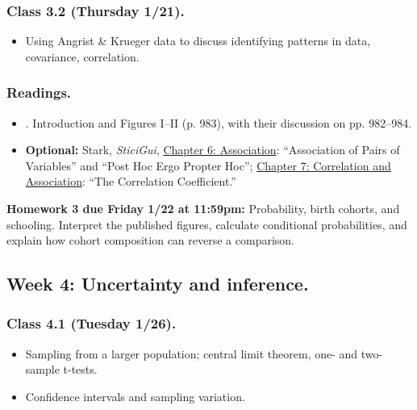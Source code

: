 \documentclass[letterpaper, 12pt, parskip=full,DIV=10]{scrartcl}
\begin{document}
\subsubsection*{Class 3.2 (Thursday 1/21).}
\begin{itemize}
\item Using Angrist \& Krueger data to discuss identifying patterns in data, covariance, correlation.
\end{itemize}

\subsubsection*{Readings.}
\begin{itemize}
\item {}. Introduction and Figures I--II (p. 983), with their discussion on pp. 982--984.
\item \textbf{Optional:} Stark, \textit{SticiGui}, \href{https://www.stat.berkeley.edu/~stark/SticiGui/Text/association.htm}{Chapter 6: Association}: ``Association of Pairs of Variables'' and ``Post Hoc Ergo Propter Hoc''; \href{https://www.stat.berkeley.edu/~stark/SticiGui/Text/correlation.htm}{Chapter 7: Correlation and Association}: ``The Correlation Coefficient.''
\end{itemize}

\textbf{Homework 3 due Friday 1/22 at 11:59pm:}
Probability, birth cohorts, and schooling. Interpret the published figures, calculate conditional probabilities, and explain how cohort composition can reverse a comparison.

\subsection*{Week 4: Uncertainty and inference.}
\subsubsection*{Class 4.1 (Tuesday 1/26).}
\begin{itemize}
\item Sampling from a larger population; central limit theorem, one- and two-sample t-tests.
\item Confidence intervals and sampling variation.
\end{itemize}
\end{document}
